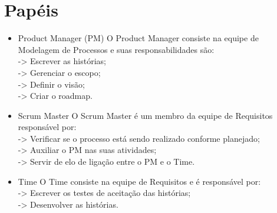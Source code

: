 \section{Papéis}

\begin{itemize}
  \item Product Manager (PM)
 \subitem O Product Manager consiste na equipe de Modelagem de Processos e suas responsabilidades são: \\
      \subitem-> Escrever as histórias;\\
      \subitem-> Gerenciar o escopo; \\
      \subitem-> Definir o visão; \\
      \subitem-> Criar o roadmap.\\

      
  \item Scrum Master 
 \subitem O  Scrum Master é um membro da equipe de Requisitos responsável por: \\
      \subitem-> Verificar se o processo está sendo realizado conforme planejado;\\
      \subitem-> Auxiliar o PM nas suas atividades; \\
      \subitem-> Servir de elo de ligação entre o PM e o Time. \\

  \item Time
 \subitem O  Time consiste na equipe de Requisitos e é responsável por: \\
      \subitem-> Escrever os testes de aceitação das histórias;\\
      \subitem-> Desenvolver as histórias. \\
\end{itemize}
